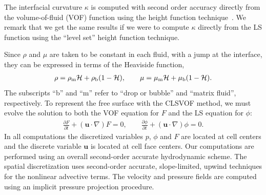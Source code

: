\documentclass[%
 reprint,
 showkeys,
 amsmath,amssymb,
 aps,
 prfluids,
 onecolumn
]{revtex4-2}
\newcommand{\Hea}{\mathcal{H}}
\newcommand{\vv}{\mathbf}
\newcommand{\bmu}{\vv{u}}
\begin{document}
The interfacial curvature $\kappa$ is
computed with second order accuracy directly from the volume-of-fluid (VOF)
function using the height function technique~\cite{Sus03,SUSSMAN2007469}.  
We remark that we get the same
results if we were to compute $\kappa$ directly from the LS function using the
``level set'' height function technique.

Since $\rho$ and $\mu$ are taken to be constant in each fluid, with a jump at
the interface, they can be expressed in terms of the Heaviside function,
%
\begin{eqnarray}\label{rhomu}
  \rho=\rho_{\rm m}\Hea+\rho_{\rm b}(1-\Hea), \qquad 
  \mu=\mu_{\rm m}\Hea+\mu_{\rm b}(1-\Hea).
\end{eqnarray}
%
The subscripts ``b'' and ``m'' refer to ``drop or bubble'' and ``matrix
fluid'', respectively. To represent the free surface with the CLSVOF method, we
must evolve the solution to both the VOF equation for $F$ and the LS equation
for $\phi$:
%
\begin{align}\label{eq:clsvof}
  \frac{\partial F}{\partial t}+(\bmu\cdot\nabla)F = 0, \qquad 
  \frac{\partial \phi}{\partial t}+(\bmu\cdot\nabla)\phi = 0. 
\end{align}
%
In all computations the discretized variables $p$, $\phi$ and $F$ are located at
cell centers and the discrete variable $\bmu$ is located at cell face centers.
Our computations are performed using an overall second-order accurate
hydrodynamic scheme.  The spatial discretization uses second-order accurate,
slope-limited, upwind techniques for the nonlinear advective terms.  The
velocity and pressure fields are computed using an implicit pressure projection
procedure. 
\end{document}
